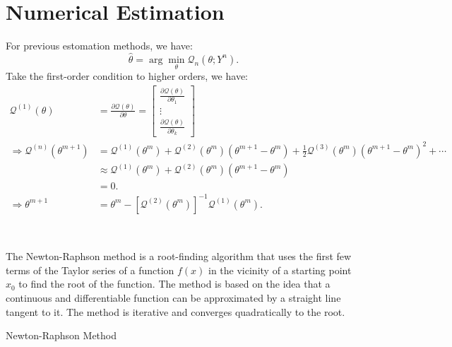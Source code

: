 \section{Numerical Estimation}

For previous estomation methods, we have:
\[
\hat{\theta} = \arg \min_{\theta} \mathcal{Q}_n (\theta; Y^n).
\]
Take the first-order condition to higher orders, we have:
\begin{align*}
    \mathcal{Q}^{(1)}(\theta ) &= \frac{\partial \mathcal{Q}(\theta)}{\partial \theta} = \begin{bmatrix}
        \frac{\partial \mathcal{Q}(\theta)}{\partial \theta_1} \\
        \vdots \\
        \frac{\partial \mathcal{Q}(\theta)}{\partial \theta_k}
    \end{bmatrix} \\
    \Rightarrow 
    \mathcal{Q}^{(n)}(\theta^{m+1}) &= \mathcal{Q}^{(1)}(\theta^{m}) + \mathcal{Q}^{(2)}(\theta^{m}) (\theta^{m+1} - \theta^{m}) + \frac{1}{2} \mathcal{Q}^{(3)}(\theta^{m}) (\theta^{m+1} - \theta^{m})^2 + \cdots \\
    & \approx \mathcal{Q}^{(1)}(\theta^{m}) + \mathcal{Q}^{(2)}(\theta^{m}) (\theta^{m+1} - \theta^{m}) \\
    &= 0. \\
    \Rightarrow \theta^{m+1} &= \theta^{m} - \left[\mathcal{Q}^{(2)}(\theta^{m})\right]^{-1} \mathcal{Q}^{(1)}(\theta^{m}).
\end{align*}

\begin{note}
    \

    The Newton-Raphson method is a root-finding algorithm that uses the first few terms of the Taylor series of a function $f(x)$ in the vicinity of a starting point $x_0$ to find the root of the function. 
    The method is based on the idea that a continuous and differentiable function can be approximated by a straight line tangent to it. 
    The method is iterative and converges quadratically to the root.

    \begin{algorithm}[H]
        \caption{Newton-Raphson Method}
        \SetAlgoLined
        
        
    \end{algorithm}
\end{note}

